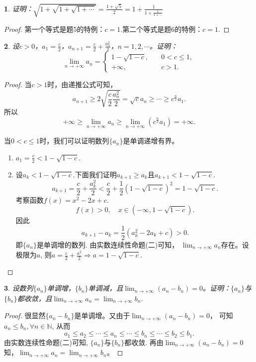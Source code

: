 \documentclass[utf8]{book}
\newtheorem{example}{}[section]             %
\begin{document}
\begin{example}
证明：$\displaystyle \sqrt{1+\sqrt{1+\sqrt{1+\cdots}}}=\frac{1+\sqrt{5}}{2} =  1 + \displaystyle \frac{1}{1+\displaystyle \frac{1}{1+\cdots}}$
\end{example}
\begin{proof}
第一个等式是题5的特例：$c=1$.第二个等式是题6的特例：$c=1$.
\end{proof}
\begin{example}
设$c>0$，$a_1=\frac{c}{2}$，$a_{n+1}=\frac{c}{2}+\frac{a_n^2}{2}$，$n=1,2,\cdots$。证明：
\begin{equation*}
\displaystyle \lim_{n\to +\infty}a_n=
\begin{cases}
1-\sqrt{1-c},\quad&0<c\leq 1,\\
+\infty, \quad&c > 1.
\end{cases}
\end{equation*}
\end{example}
\begin{proof}
当$c>1$时，由递推公式可知，$$a_{n+1}\geq 2\displaystyle\sqrt{\frac{c}{2}{\frac{a_n^2}{2}}}=\sqrt{c}a_n\geq \cdots\geq c^{\frac{n}{2}}a_1.$$
所以$$+\infty \geq \displaystyle \lim_{n\to +\infty}a_n \geq \displaystyle \lim_{n\to +\infty}(c^{\frac{n}{2}}a_1) = +\infty.$$

当$0<c\leq 1$时，我们可以证明数列$\{a_n\}$是单调递增有界。
\renewcommand\labelenumi{\normalfont(\theenumi)}
\begin{enumerate}
\item $a_1 = \frac{c}{2} < 1-\sqrt{1-c}$.
\item 设$a_k < 1-\sqrt{1-c}$.下面我们证明$a_{k+1} \geq a_{k}$且$a_{k+1} < 1-\sqrt{1-c}$.
$$a_{k+1} = \frac{c}{2} + \frac{a_{k}^2}{2} <\frac{c}{2} + \frac{1}{2}\left(1-\sqrt{1-c}\right)^2 = 1-\sqrt{1-c}.$$
考察函数$f(x) = x^2-2x+c$. $$f(x) > 0, \quad x\in(-\infty, 1-\sqrt{1-c}).$$
因此 $$a_{k+1} - a_{k} = \frac{1}{2}(a_k^2-2a_k+c) > 0.$$
即$\{a_n\}$是单调增的数列. 由实数连续性命题(二)可知， $\displaystyle \lim_{n\to +\infty}a_n$存在。设极限为$a$, 则$a=\frac{c}{2}+\frac{a^2}{2}\Rightarrow a = 1-\sqrt{1-c}$.
\end{enumerate}\end{proof}
\begin{example}
设数列$\{a_n\}$单调增，$\{b_n\}$单调减，且$\displaystyle \lim_{n\to +\infty}(a_n-b_n)=0$。证明：$\{a_n\}$与$\{b_n\}$都收敛，且$\displaystyle \lim_{n\to +\infty}a_n=\displaystyle \lim_{n\to +\infty}b_n$.
\end{example}
\begin{proof}
很显然$\{a_n-b_n\}$是单调增。又由于$\displaystyle \lim_{n\to +\infty}(a_n-b_n)=0$， 可知 $a_n \leq b_n,\forall n\in\mathbb{N}$, 从而
$$a_1 \leq a_2 \leq\cdots\leq a_n \leq \cdots \leq b_n \leq \cdots \leq b_2\leq b_1.$$
由实数连续性命题(二)可知, $\{a_n\}$与$\{b_n\}$都收敛. 再由$\displaystyle \lim_{n\to +\infty}(a_n-b_n)=0$知，$\displaystyle \lim_{n\to +\infty}a_n=\displaystyle \lim_{n\to +\infty}b_n$。
\end{proof}
\end{document}
